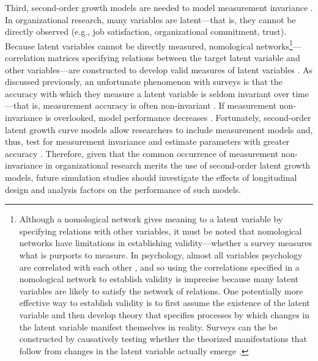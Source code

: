 \documentclass[
12pt, %
twoside,
english]{guelphthesis}
\begin{document}
Third, second-order growth models are needed to model measurement invariance \autocite{sayer2001,hancock2001}. In organizational research, many variables are latent---that is, they cannot be directly observed (e.g., job satisfaction, organizational commitment, trust). Because latent variables cannot be directly measured, nomological networks\footnote{Although a nomological network gives meaning to a latent variable by specifying relations with other variables, it must be noted that nomological networks have limitations in establishing validity---whether a survey measures what is purports to measure. In psychology, almost all variables psychology are correlated with each other \parencite{meehl1978}, and so using the correlations specified in a nomological network to establish validity is imprecise because many latent variables are likely to satisfy the network of relations. One potentially more effective way to establish validity is to first assume the existence of the latent variable and then develop theory that specifies processes by which changes in the latent variable manifest themselves in reality. Surveys can the be constructed by causatively testing whether the theorized manifestations that follow from changes in the latent variable actually emerge \parencite[for a review, see][]{borsboom2004}.}---correlation matrices specifying relations between the target latent variable and other variables---are constructed to develop valid measures of latent variables \autocite{cronbach1955}. As discussed previously, an unfortunate phenomenon with surveys is that the accuracy with which they measure a latent variable is seldom invariant over time---that is, measurement accuracy is often non-invariant \autocite{vandenberg2000,vandeschoot2015}. If measurement non-invariance is overlooked, model performance decreases \autocite{kim2014b,jeon2020}. Fortunately, second-order latent growth curve models allow researchers to include measurement models and, thus, test for measurement invariance and estimate parameters with greater accuracy \autocite[e.g.,][]{kim2014a}. Therefore, given that the common occurrence of measurement non-invariance in organizational research merits the use of second-order latent growth models, future simulation studies should investigate the effects of longitudinal design and analysis factors on the performance of such models.
\end{document}
